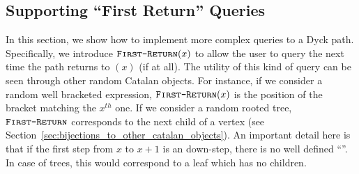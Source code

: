 \subsection{Supporting ``First Return'' Queries}%
\label{sec:supporting_first_return_queries}
In this section, we show how to implement more complex queries to a Dyck path.
Specifically, we introduce $\texttt{\textsc{First-Return}}(x)$ to allow the user to query the next time the path returns to $(x)$ (if at all).
The utility of this kind of query can be seen through other random Catalan objects.
For instance, if we consider a random well bracketed expression, $\texttt{\textsc{First-Return}}(x)$ is the position of the bracket matching the $x^{th}$ one.
If we consider a random rooted tree,
$\texttt{\textsc{First-Return}}$ corresponds to the next child of a vertex (see Section~\ref{sec:bijections_to_other_catalan_objects}).
An important detail here is that if the first step from $x$ to $x+1$ is an down-step, there is no well defined ``''.
In case of trees, this would correspond to a leaf which has no children.




